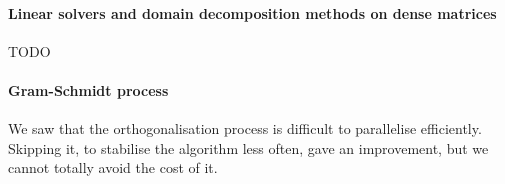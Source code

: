 \paragraph{Linear solvers and domain decomposition methods on dense matrices}
TODO

\paragraph{Gram-Schmidt process}
We saw that the orthogonalisation process is difficult to parallelise efficiently.
Skipping it, to stabilise the algorithm less often, gave an improvement, but we cannot totally avoid the cost of it.
